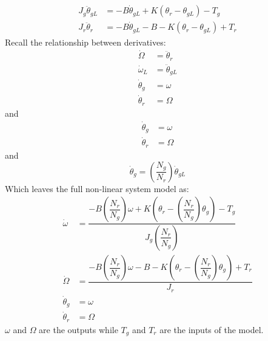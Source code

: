\begin{align} 
	J_{g} \ddot{\theta}_{gL} & = -B \dot{\theta}_{gL} + K(\theta_r - \theta_{gL}) - T_{g} \label{eq:wtlin_comp_drivetrain_flex_1} \\
	J_{r} \ddot{\theta}_r & = -B \dot{\theta}_{gL} -B - K(\theta_r - \theta_{gL}) + T_{r} \label{eq:wtlin_comp_drivetrain_flex_2}
\end{align}
Recall the relationship between derivatives:
\begin{align}
	\dot{\Omega} & = \ddot{\theta}_r \\
	\dot{\omega}_{L} & = \ddot{\theta}_{gL} \\
	\dot{\theta}_g & = \omega \\
	\dot{\theta}_r & = \Omega
\end{align}
and
\begin{align}
	\dot{\theta}_g & = \omega \\
	\dot{\theta}_r & = \Omega
\end{align}
and
\begin{equation}\label{eq:wtlin_comp_drivetrain_flex_mod_3}
	\dot{\theta}_g = \left(\dfrac{N_g}{N_r}\right) \dot{\theta}_{gL} 
\end{equation}
Which leaves the full non-linear system model as:
\begin{align} 
	\dot{\omega} & = \dfrac{-B \left(\dfrac{N_r}{N_g}\right)\omega + K(\theta_r - \left(\dfrac{N_r}{N_g}\right) \theta_{g}) - T_{g}}{J_{g} \left(\dfrac{N_r}{N_g}\right) } \label{eq:wtlin_comp_drivetrain_flex_mod_1} \\
	\dot{\Omega} & = \dfrac{-B \left(\dfrac{N_r}{N_g}\right) \omega -B - K(\theta_r - \left(\dfrac{N_r}{N_g}\right) \theta_{g}) + T_{r}}{J_{r}} \label{eq:wtlin_comp_drivetrain_flex_mod_2} \\
	\dot{\theta}_g & = \omega \\
	\dot{\theta}_r & = \Omega
\end{align}
$ \omega $ and $ \Omega $ are the outputs while $ T_g $ and $ T_r $ are the inputs of the model.
	

